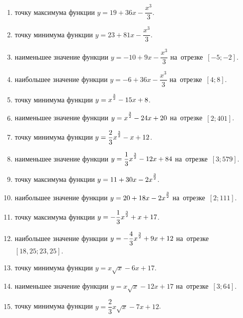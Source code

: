 \documentclass[a4paper,10pt]{article}
\begin{document}
\begin{enumerate}
\item {} точку максимума функции $y=19 +36x-\dfrac{x^3}{3}$.

\item {} точку минимума функции $y=23 +81x-\dfrac{x^3}{3}$.

\item {} наименьшее значение функции $y=-10 +9x-\dfrac{x^3}{3}$ на~отрезке~$\left[-5;-2\right]$.

\item {} наибольшее значение функции $y=-6 +36x-\dfrac{x^3}{3}$ на~отрезке~$\left[4;8\right]$.

\item {} точку минимума функции $y=x\strut^{\frac{3}{2}} -15x+8$.

\item {} наименьшее значение функции $y=x\strut^{\frac{3}{2}} -24x+20$ на~отрезке~$\left[2;401\right]$.

\item {} точку минимума функции $y=\dfrac{2}{3}x\strut^{\frac{3}{2}} -x+12$.

\item {} наименьшее значение функции $y=\dfrac{1}{3}x\strut^{\frac{3}{2}} -12x+84$ на~отрезке~$\left[3;579\right]$.

\item {} точку максимума функции $y=11+30x-2x\strut^{\frac{3}{2}}$.

\item {} наибольшее значение функции $y=20+18x-2x\strut^{\frac{3}{2}}$ на~отрезке~$\left[2;111\right]$.

\item {} точку максимума функции $y=-\dfrac{1}{3}x\strut^{\frac{3}{2}} +x+17$.

\item {} наибольшее значение функции $y=-\dfrac{4}{3}x\strut^{\frac{3}{2}} +9x+12$ на~отрезке~$\left[18,25;23,25\right]$.

\item {} точку минимума функции $y=x\sqrt{x} -6x+17$.

\item {} наименьшее значение функции $y=x\sqrt{x} -12x+17$ на~отрезке~$\left[3;64\right]$.

\item {} точку минимума функции $y=\dfrac{2}{3}x\sqrt{x} -7x+12$.


\end{enumerate}
\end{document}
